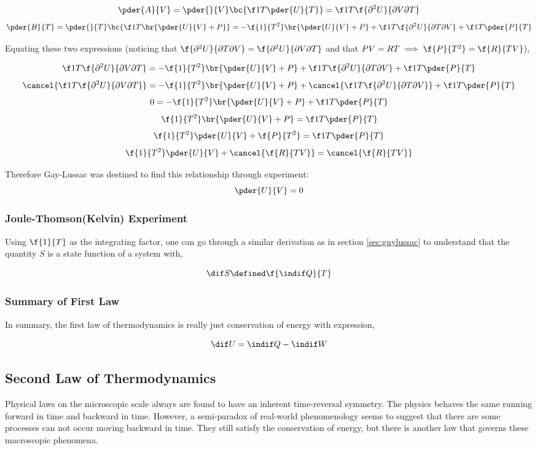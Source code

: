 \documentclass{article}
\begin{document}
\[ \pder{A}{V} = \pder{}{V}\bc{\f1T \pder{U}{T}} = \f1T \f{\partial^2 U}{\partial V \partial T} \]
\[ \pder{B}{T} = \pder{}{T}\bc{\f1T \br{\pder{U}{V} + P}} = -\f{1}{T^2} \br{\pder{U}{V} + P} + \f1T \f{\partial^2 U}{\partial T \partial V} + \f1T \pder{P}{T} \]

Equating these two expressions (noticing that $\f{\partial^2 U}{\partial T \partial V} = \f{\partial^2 U}{\partial V \partial T}$ and that $PV = RT \implies \f{P}{T^2} = \f{R}{TV}$),

\[ \f1T \f{\partial^2 U}{\partial V \partial T} = -\f{1}{T^2} \br{\pder{U}{V} + P} + \f1T \f{\partial^2 U}{\partial T \partial V} + \f1T \pder{P}{T} \]
\[ \cancel{\f1T \f{\partial^2 U}{\partial V \partial T}} = -\f{1}{T^2} \br{\pder{U}{V} + P} + \cancel{\f1T \f{\partial^2 U}{\partial T \partial V}} + \f1T \pder{P}{T} \]
\[ 0 = -\f{1}{T^2} \br{\pder{U}{V} + P} + \f1T \pder{P}{T} \]
\[ \f{1}{T^2} \br{\pder{U}{V} + P} = \f1T \pder{P}{T} \]
\[ \f{1}{T^2} \pder{U}{V} + \f{P}{T^2} = \f1T \pder{P}{T} \]
\[ \f{1}{T^2} \pder{U}{V} + \cancel{\f{R}{TV}} = \cancel{\f{R}{TV}} \]

Therefore Gay-Lussac was destined to find this relationship through experiment:
\[ \pder{U}{V} = 0 \]

\subsubsection{Joule-Thomson(Kelvin) Experiment}

Using $\f{1}{T}$ as the integrating factor, one can go through a similar derivation as in section \ref{sec:guylussac} to understand that the quantity $S$ is a state function of a system with,

\[ \dif S \defined \f{\indif Q}{T}  \]

\subsubsection{Summary of First Law}

In summary, the first law of thermodynamics is really just conservation of energy with expression,

\[ \dif U = \indif Q - \indif W \]

\subsection{Second Law of Thermodynamics}

Physical laws on the microscopic scale always are found to have an inherent time-reversal symmetry. The physics behaves the same running forward in time and backward in time. However, a semi-paradox of real-world phenomenology seems to suggest that there are some processes can not occur moving backward in time. They still satisfy the conservation of energy, but there is another law that governs these macroscopic phenomena.
\end{document}
